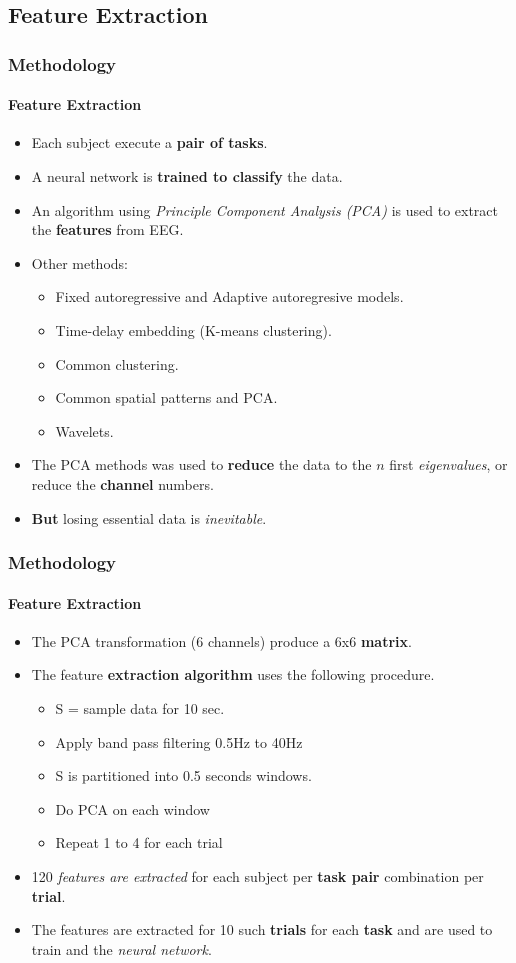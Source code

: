 \subsection{Feature Extraction}
\frame
{
\frametitle{Methodology}
\framesubtitle{Feature Extraction}
\begin{itemize}
	\item Each subject execute a \textbf{pair of tasks}.
	\item A neural network is \textbf{trained to classify} the data.
	\item An algorithm using \emph{Principle Component Analysis (PCA)} is used to extract the \textbf{features} from EEG.
	\item Other methods:
	\begin{itemize}
		\item Fixed autoregressive and Adaptive autoregresive models.
		\item Time-delay embedding (K-means clustering).
		\item Common clustering.
		\item Common spatial patterns and PCA.
		\item Wavelets.
	\end{itemize}
	\item The PCA methods was used to \textbf{reduce} the data to the $n$ first \emph{eigenvalues}, or reduce the \textbf{channel} numbers.
	\item \textbf{But} losing essential data is \emph{inevitable}.
\end{itemize}
}

\frame
{
\frametitle{Methodology}
\framesubtitle{Feature Extraction}
\begin{itemize}
	\item The PCA transformation (6 channels) produce a 6x6 \textbf{matrix}.
	\item The feature \textbf{extraction algorithm} uses the following procedure.
	\begin{itemize}
		\item S = sample data for 10 sec.
		\item Apply band pass filtering 0.5Hz to 40Hz
		\item S is partitioned into 0.5 seconds windows.
		\item Do PCA on each window
		\item Repeat 1 to 4 for each trial
	\end{itemize}
	\item 120 \emph{features are extracted} for each subject per \textbf{task pair} combination per \textbf{trial}.
	\item The features are extracted for 10 such \textbf{trials} for each \textbf{task} and are used to train and the \emph{neural network}.
\end{itemize}
}

